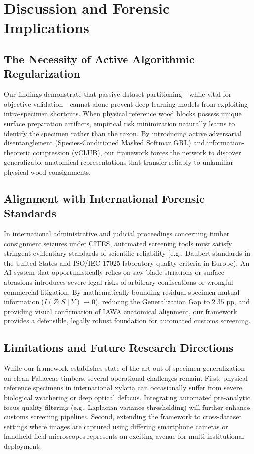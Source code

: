 \documentclass[a4paper,fleqn]{cas-sc}
\begin{document}
\section{Discussion and Forensic Implications}
\label{sec:discussion}

\subsection{The Necessity of Active Algorithmic Regularization}
Our findings demonstrate that passive dataset partitioning—while vital for objective validation—cannot alone prevent deep learning models from exploiting intra-specimen shortcuts. When physical reference wood blocks possess unique surface preparation artifacts, empirical risk minimization naturally learns to identify the specimen rather than the taxon. By introducing active adversarial disentanglement (Species-Conditioned Masked Softmax GRL) and information-theoretic compression (vCLUB), our framework forces the network to discover generalizable anatomical representations that transfer reliably to unfamiliar physical wood consignments.

\subsection{Alignment with International Forensic Standards}
In international administrative and judicial proceedings concerning timber consignment seizures under CITES, automated screening tools must satisfy stringent evidentiary standards of scientific reliability (e.g., Daubert standards in the United States and ISO/IEC 17025 laboratory quality criteria in Europe). An AI system that opportunistically relies on saw blade striations or surface abrasions introduces severe legal risks of arbitrary confiscations or wrongful commercial litigation. By mathematically bounding residual specimen mutual information ($I(Z; S \mid Y) \to 0$), reducing the Generalization Gap to $2.35\text{ pp}$, and providing visual confirmation of IAWA anatomical alignment, our framework provides a defensible, legally robust foundation for automated customs screening.

\subsection{Limitations and Future Research Directions}
While our framework establishes state-of-the-art out-of-specimen generalization on clean Fabaceae timbers, several operational challenges remain. First, physical reference specimens in international xylaria can occasionally suffer from severe biological weathering or deep optical defocus. Integrating automated pre-analytic focus quality filtering (e.g., Laplacian variance thresholding) will further enhance customs screening pipelines. Second, extending the framework to cross-dataset settings where images are captured using differing smartphone cameras or handheld field microscopes represents an exciting avenue for multi-institutional deployment.
\end{document}
